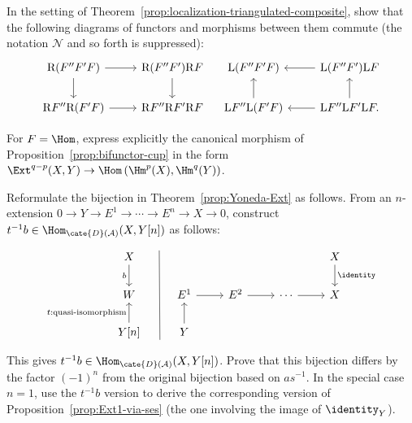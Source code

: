 \begin{Exercises}
	\item In the setting of
	Theorem~\ref{prop:localization-triangulated-composite}, show that the
	following diagrams of functors and morphisms between them commute (the
	notation $\mathcal{N}$ and so forth is suppressed):
	\[\begin{tikzcd}
		\mathrm{R}(F'' F' F) \arrow[r] \arrow[d] & \mathrm{R}(F'' F') \mathrm{R}F \arrow[d] \\
		\mathrm{R}F'' \mathrm{R}(F'F) \arrow[r] & \mathrm{R}F'' \mathrm{R}F' \mathrm{R}F
	\end{tikzcd} \quad \begin{tikzcd}
		\mathrm{L}(F'' F' F) & \mathrm{L}(F'' F') \mathrm{L}F \arrow[l] \\
		\mathrm{L}F'' \mathrm{L}(F'F) \arrow[u] & \mathrm{L}F'' \mathrm{L}F' \mathrm{L}F \arrow[u] \arrow[l] .
	\end{tikzcd}\]

	\item For $F=\Hom$, express explicitly the canonical morphism of
	Proposition~\ref{prop:bifunctor-cup} in the form
	$\Ext^{q-p}(X,Y)\to\Hom\left(\Hm^p(X),\Hm^q(Y)\right)$.

	\item Reformulate the bijection in Theorem~\ref{prop:Yoneda-Ext} as follows.
	From an $n$-extension
	$0\to Y\to E^1\to\cdots\to E^n\to X\to0$, construct
	$t^{-1}b\in\Hom_{\cate{D}(\mathcal{A})}(X,Y[n])$ as follows:
	\[\begin{tikzcd}
		X \arrow[d, "b"']\arrow[phantom, r, "" {name=A, yshift=2ex}] & {} & & & X \arrow[d, "\identity"] \\
		W & E^1 \arrow[r] & E^2 \arrow[r] & \cdots \arrow[r] & X \\
		Y[n] \arrow[u, "{t: \text{quasi-isomorphism}}"] \arrow[phantom, r, "" {name=B, yshift=-2ex}] & Y \arrow[u] & & &
		\arrow[dash, from=A, to=B]
	\end{tikzcd}\]
	This gives $t^{-1}b\in\Hom_{\cate{D}(\mathcal{A})}(X,Y[n])$. Prove that
	this bijection differs by the factor $(-1)^n$ from the original bijection
	based on $as^{-1}$. In the special case $n=1$, use the $t^{-1}b$ version to
	derive the corresponding version of Proposition~\ref{prop:Ext1-via-ses}
	(the one involving the image of $\identity_Y$).


\end{Exercises}
